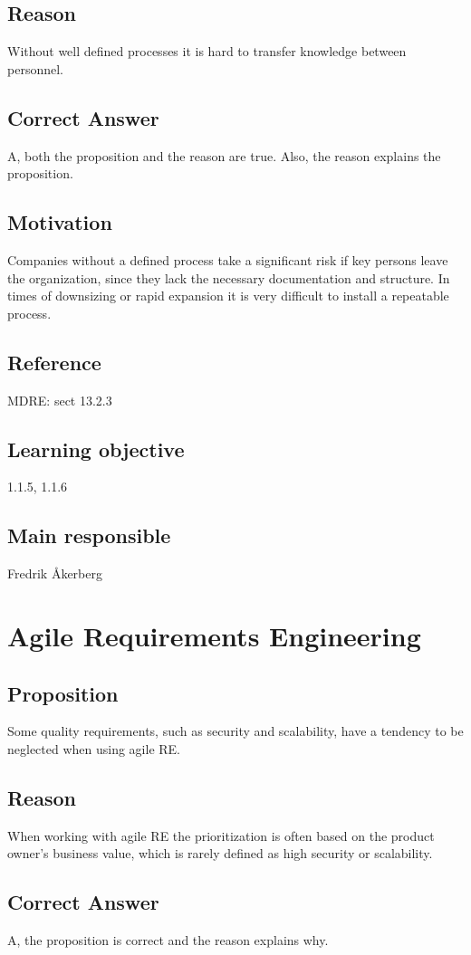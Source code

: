 \documentclass[a4paper]{article}
\begin{document}
\subsection*{Reason}
Without well defined processes it is hard to transfer knowledge between personnel. 
\subsection*{Correct Answer}
A, both the proposition and the reason are true. Also, the reason explains the proposition.
\subsection*{Motivation}
Companies without a defined process take a significant risk if key persons leave the organization, since they lack the necessary documentation and structure. In times of downsizing or rapid expansion it is very difficult to install a repeatable process.
\subsection*{Reference}
MDRE: sect 13.2.3
\subsection*{Learning objective}
1.1.5, 1.1.6
\subsection*{Main responsible}
Fredrik Åkerberg
 
\section{Agile Requirements Engineering}
\subsection*{Proposition}
Some quality requirements, such as security and scalability, have a tendency to be neglected when using agile RE. 
\subsection*{Reason}
When working with agile RE the prioritization is often based on the product owner's business value, which is rarely defined as high security or scalability.
\subsection*{Correct Answer}
A, the proposition is correct and the reason explains why.
\end{document}
